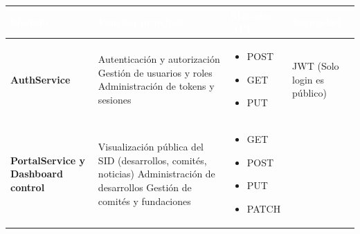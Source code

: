 \documentclass[11pt,a4paper]{article}
\newcommand{\headerStyle}[1]{\textcolor{white}{\textbf{#1}}}
\begin{document}


\begin{table}[H]
	\centering
	\renewcommand{\arraystretch}{1.5}
	\begin{tabular}{>{\raggedright\arraybackslash}p{2.8cm} >{\raggedright\arraybackslash}p{5.0cm} >{\raggedright\arraybackslash}p{3.0cm} >{\raggedright\arraybackslash}p{3.0cm}}
		\toprule
		\rowcolor{headercolor}
		\headerStyle{M{\'o}dulo}                   & \headerStyle{Función principal} & \headerStyle{Métodos API} & \headerStyle{Seguridad} \\
		\midrule
		\rowcolor{rowcolor1}
		\textbf{AuthService}                       &
		Autenticación y autorización\newline
		Gestión de usuarios y roles\newline
		Administración de tokens y sesiones        &
		\begin{itemize}[nosep,leftmargin=*]
			\item POST
			\item GET
			\item PUT
		\end{itemize}        &
		JWT\newline
		(Solo login es público)                                                                                                            \\
		\midrule
		\rowcolor{rowcolor2}
		\textbf{PortalService y Dashboard control} &
		Visualización pública del SID\newline
		(desarrollos, comités, noticias)\newline
		Administración de desarrollos\newline
		Gestión de comités y fundaciones           &
		\begin{itemize}[nosep,leftmargin=*]
			\item GET
			\item POST
			\item PUT
			\item PATCH

\end{itemize}
\end{tabular}
\end{table}
\end{document}

